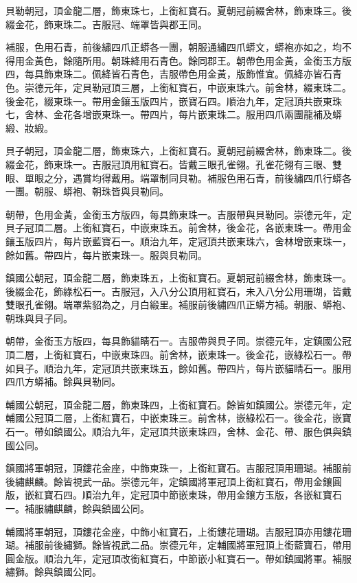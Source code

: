 \begin{pinyinscope}
貝勒朝冠，頂金龍二層，飾東珠七，上銜紅寶石。夏朝冠前綴舍林，飾東珠三。後綴金花，飾東珠二。吉服冠、端罩皆與郡王同。

補服，色用石青，前後繡四爪正蟒各一團，朝服通繡四爪蟒文，蟒袍亦如之，均不得用金黃色，餘隨所用。朝珠絳用石青色。餘同郡王。朝帶色用金黃，金銜玉方版四，每具飾東珠二。佩絳皆石青色，吉服帶色用金黃，版飾惟宜。佩絳亦皆石青色。崇德元年，定貝勒冠頂三層，上銜紅寶石，中嵌東珠六。前舍林，綴東珠二。後金花，綴東珠一。帶用金鑲玉版四片，嵌寶石四。順治九年，定冠頂共嵌東珠七，舍林、金花各增嵌東珠一。帶四片，每片嵌東珠二。服用四爪兩團龍補及蟒緞、妝緞。

貝子朝冠，頂金龍二層，飾東珠六，上銜紅寶石。夏朝冠前綴舍林，飾東珠二。後綴金花，飾東珠一。吉服冠頂用紅寶石。皆戴三眼孔雀翎。孔雀花翎有三眼、雙眼、單眼之分，遇賞均得戴用。端罩制同貝勒。補服色用石青，前後繡四爪行蟒各一團。朝服、蟒袍、朝珠皆與貝勒同。

朝帶，色用金黃，金銜玉方版四，每具飾東珠一。吉服帶與貝勒同。崇德元年，定貝子冠頂二層。上銜紅寶石，中嵌東珠五。前舍林，後金花，各嵌東珠一。帶用金鑲玉版四片，每片嵌藍寶石一。順治九年，定冠頂共嵌東珠六，舍林增嵌東珠一，餘如舊。帶四片，每片嵌東珠一。服與貝勒同。

鎮國公朝冠，頂金龍二層，飾東珠五，上銜紅寶石。夏朝冠前綴舍林，飾東珠一。後綴金花，飾綠松石一。吉服冠，入八分公頂用紅寶石，未入八分公用珊瑚，皆戴雙眼孔雀翎。端罩紫貂為之，月白緞里。補服前後繡四爪正蟒方補。朝服、蟒袍、朝珠與貝子同。

朝帶，金銜玉方版四，每具飾貓睛石一。吉服帶與貝子同。崇德元年，定鎮國公冠頂二層，上銜紅寶石，中嵌東珠四。前舍林，嵌東珠一。後金花，嵌綠松石一。帶如貝子。順治九年，定冠頂共嵌東珠五，餘如舊。帶四片，每片嵌貓睛石一。服用四爪方蟒補。餘與貝勒同。

輔國公朝冠，頂金龍二層，飾東珠四，上銜紅寶石。餘皆如鎮國公。崇德元年，定輔國公冠頂二層，上銜紅寶石，中嵌東珠三。前舍林，嵌綠松石一。後金花，嵌寶石一。帶如鎮國公。順治九年，定冠頂共嵌東珠四，舍林、金花、帶、服色俱與鎮國公同。

鎮國將軍朝冠，頂鏤花金座，中飾東珠一，上銜紅寶石。吉服冠頂用珊瑚。補服前後繡麒麟。餘皆視武一品。崇德元年，定鎮國將軍冠頂上銜紅寶石，帶用金鑲圓版，嵌紅寶石四。順治九年，定冠頂中節嵌東珠，帶用金鑲方玉版，各嵌紅寶石一。補服繡麒麟，餘與鎮國公同。

輔國將軍朝冠，頂鏤花金座，中飾小紅寶石，上銜鏤花珊瑚。吉服冠頂亦用鏤花珊瑚。補服前後繡獅。餘皆視武二品。崇德元年，定輔國將軍冠頂上銜藍寶石，帶用圓金版。順治九年，定冠頂改銜紅寶石，中節嵌小紅寶石一。帶如鎮國將軍。補服繡獅。餘與鎮國公同。


\end{pinyinscope}
